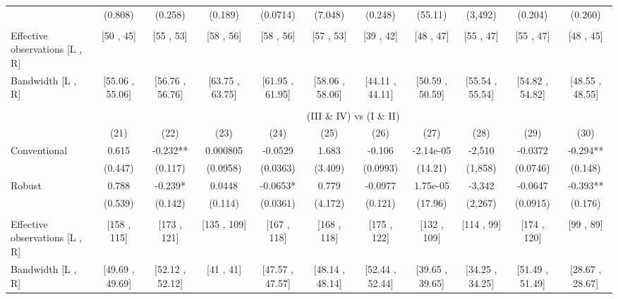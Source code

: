 \begin{tabular}{lcccccccccc}
      & (0.808) & (0.258) & (0.189) & (0.0714) & (7.048) & (0.248) & (55.11) & (3,492) & (0.204) & (0.260) \\
      &       &       &       &       &       &       &       &       &       &  \\
\midrule
Effective observations [L , R] & [50 , 45] & [55 , 53] & [58 , 56] & [58 , 56] & [57 , 53] & [39 , 42] & [48 , 47] & [55 , 47] & [55 , 47] & [48 , 45] \\
Bandwidth [L , R] & [55.06 , 55.06] & [56.76 , 56.76] & [63.75 , 63.75] & [61.95 , 61.95] & [58.06 , 58.06] & [44.11 , 44.11] & [50.59 , 50.59] & [55.54 , 55.54] & [54.82 , 54.82] & [48.55 , 48.55] \\
\midrule
\midrule
      &       &       &       &       &       &       &       &       &       &  \\
\midrule
      & \multicolumn{10}{c}{(III \& IV) vs (I \& II)} \\
\midrule
\midrule
      & (21)  & (22)  & (23)  & (24)  & (25)  & (26)  & (27)  & (28)  & (29)  & (30) \\
\midrule
\midrule
Conventional & 0.615 & -0.232** & 0.000805 & -0.0529 & 1.683 & -0.106 & -2.14e-05 & -2,510 & -0.0372 & -0.294** \\
      & (0.447) & (0.117) & (0.0958) & (0.0363) & (3.409) & (0.0993) & (14.21) & (1,858) & (0.0746) & (0.148) \\
Robust & 0.788 & -0.239* & 0.0448 & -0.0653* & 0.779 & -0.0977 & 1.75e-05 & -3,342 & -0.0647 & -0.393** \\
      & (0.539) & (0.142) & (0.114) & (0.0361) & (4.172) & (0.121) & (17.96) & (2,267) & (0.0915) & (0.176) \\
      &       &       &       &       &       &       &       &       &       &  \\
\midrule
Effective observations [L , R] & [158 , 115] & [173 , 121] & [135 , 109] & [167 , 118] & [168 , 118] & [175 , 122] & [132 , 109] & [114 , 99] & [174 , 120] & [99 , 89] \\
Bandwidth [L , R] & [49.69 , 49.69] & [52.12 , 52.12] & [41 , 41] & [47.57 , 47.57] & [48.14 , 48.14] & [52.44 , 52.44] & [39.65 , 39.65] & [34.25 , 34.25] & [51.49 , 51.49] & [28.67 , 28.67] \\
\bottomrule
\bottomrule
\end{tabular}%
